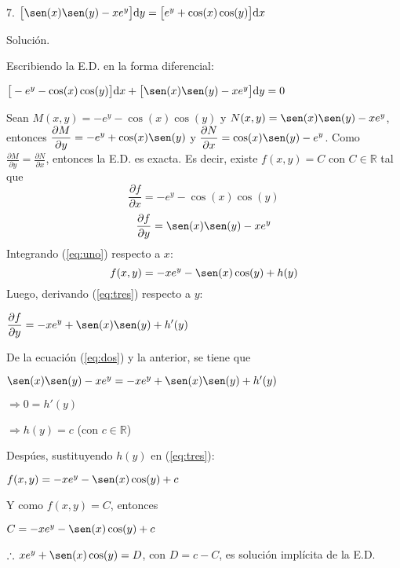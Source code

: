 \documentclass{article}
\begin{document}
    
    7. $ \big [\sen (x) \sen (y) - xe^y \big ] \mathrm{d}y = \big [e^y + \cos (x) \cos(y) \big ] \mathrm{d}x $ 

    \hspace{4 mm} Solución. 

    Escribiendo la E.D. en la forma diferencial: 

    $ \big [-e^y - \cos (x) \cos(y) \big ] \mathrm{d}x + \big [\sen (x) \sen (y) - xe^y \big ] \mathrm{d}y = 0 $ 

    Sean $ M(x,y) = -e^y - \cos (x) \cos(y) $ y $ N(x,y) = \sen (x) \sen (y) - xe^y $, entonces $ \displaystyle \frac{\partial M}{\partial y} = -e^y + \cos (x) \sen(y) $ y $ \displaystyle \frac{\partial N}{\partial x} = \cos (x) \sen(y) -e^y $. Como $ \displaystyle \frac{\partial M}{\partial y} = \frac{\partial N}{\partial x} $, entonces la E.D. es exacta. Es decir, existe $ f(x,y) = C $ con $ C \in \mathbb{R}  $ tal que
    \begin{equation}
        \frac{\partial f}{\partial x} = -e^y - \cos (x) \cos(y)
        \label{eq:uno}
    \end{equation}
    \begin{equation}
        \frac{\partial f}{\partial y} = \sen (x) \sen (y) - xe^y
        \label{eq:dos}
    \end{equation}
    Integrando (\ref{eq:uno}) respecto a $ x $:
    \begin{equation}
        f(x,y) = - xe^y - \sen (x) \cos (y) + h(y)
        \label{eq:tres}
    \end{equation}
    Luego, derivando (\ref{eq:tres}) respecto a $ y $: 

    $ \displaystyle \frac{\partial f}{\partial y} = - xe^y + \sen (x) \sen (y) + h'(y) $ 

    De la ecuación (\ref{eq:dos}) y la anterior, se tiene que 

    $ \sen (x) \sen (y) - xe^y = - xe^y + \sen (x) \sen (y) + h'(y) $ 

    $ \Longrightarrow 0 = h'(y) $ 

    $ \Longrightarrow h(y) = c $ \hfill (con $ c \in \mathbb{R} $) 
    
    Despúes, sustituyendo $ h(y) $ en (\ref{eq:tres}): 

    $ f(x,y) = - xe^y - \sen (x) \cos (y) + c $ 

    Y como $ f(x,y) = C $, entonces 

    $ C = - xe^y - \sen (x) \cos (y) + c $ 

    $ \therefore \, xe^y + \sen (x) \cos (y) = D $, con $ D = c - C $, es solución implícita de la E.D.        
\end{document}
